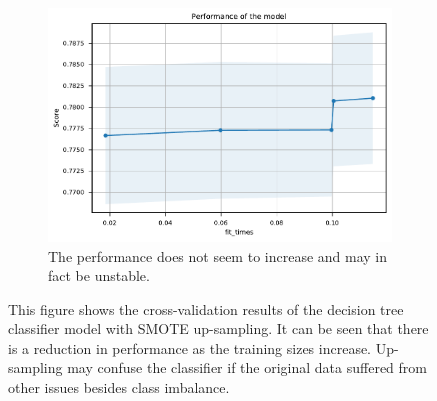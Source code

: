 \documentclass{l4proj}
\begin{document}
\begin{appendices}
\begin{figure}[htbp]
\begin{subfigure}[b]{0.70\textwidth}
        \includegraphics[width=\textwidth]{images/location/learning_curve_3_DecisionTreeLocations_sm.pdf}
        \caption{The performance does not seem to increase and may in fact be unstable.}
        \label{fig:learning_curve_3_DecisionTreeLocations_sm}
    \end{subfigure}
    \caption{This figure shows the cross-validation results of the decision tree classifier model with SMOTE up-sampling. It can be seen that there is a reduction in performance as the training sizes increase. Up-sampling may confuse the classifier if the original data suffered from other issues besides class imbalance.}\label{fig:location_sm_kfold}
\end{figure}


\end{appendices}
\end{document}
